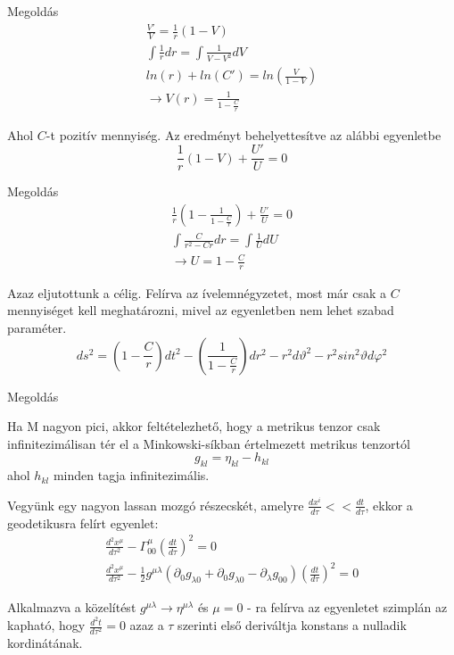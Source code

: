 \documentclass[10pt]{beamer}
\begin{document}
\begin{frame}[t]{Megoldás}
\begin{gather*}
\frac{V'}{V} = \frac{1}{r}(1 - V) \\
\int \frac{1}{r} dr = \int \frac{1}{V - V^{2}} dV \\
ln(r) + ln(C') = ln(\frac{V}{1-V}) \\
\rightarrow V(r) = \frac{1}{1-\frac{C}{r}}
\end{gather*}
\par Ahol $C$-t pozitív mennyiség. Az eredményt behelyettesítve az alábbi egyenletbe
$$\frac{1}{r}(1-V) + \frac{U'}{U} = 0$$
\end{frame}

\begin{frame}[t]{Megoldás}
\begin{gather*}
\frac{1}{r}(1 - \frac{1}{1- \frac{C}{r}}) + \frac{U'}{U} = 0 \\
\int \frac{C}{r^{2} - Cr} dr = \int \frac{1}{U} dU \\
\rightarrow U = 1 - \frac{C}{r}
\end{gather*}
\par Azaz eljutottunk a célig. Felírva az ívelemnégyzetet, most már csak a $C$ mennyiséget kell meghatározni, mivel az egyenletben
nem lehet szabad paraméter.
\begin{equation*}
ds^{2} = ( 1 - \frac{C}{r})dt^{2} - (\frac{1}{1 - \frac{C}{r}})dr^{2} - r^{2}d\vartheta^{2} - r^{2}sin^{2}\vartheta d\varphi^{2}
\end{equation*}
\end{frame}

\begin{frame}[t]{Megoldás}
\par Ha M nagyon pici, akkor feltételezhető, hogy a metrikus tenzor csak infinitezimálisan tér el a Minkowski-síkban értelmezett
metrikus tenzortól $$ g_{kl} = \eta_{kl} - h_{kl}$$ ahol $h_{kl}$ minden tagja infinitezimális.
\par Vegyünk egy nagyon lassan mozgó részecskét, amelyre $\frac{dx^{i}}{d\tau} << \frac{dt}{d\tau}$, ekkor a geodetikusra felírt
egyenlet:
\begin{gather*}
\frac{d^{2}x^{\mu}}{d\tau^{2}} - \Gamma_{00}^{\mu}(\frac{dt}{d\tau})^{2} = 0 \\
\frac{d^{2}x^{\mu}}{d\tau^{2}} - \frac{1}{2}g^{\mu\lambda}(\partial_{0}g_{\lambda 0} + \partial_{0}g_{\lambda 0} - \partial_{\lambda}g_{00})(\frac{dt}{d\tau})^{2} = 0
\end{gather*}
\par Alkalmazva a közelítést $g^{\mu\lambda} \rightarrow \eta^{\mu\lambda}$ és $\mu = 0$ - ra felírva az egyenletet szimplán az kapható, hogy
 $\frac{d^{2}t}{d\tau^{2}} = 0$ azaz a $\tau$ szerinti első deriváltja konstans a nulladik kordinátának.
\end{frame}
\end{document}
